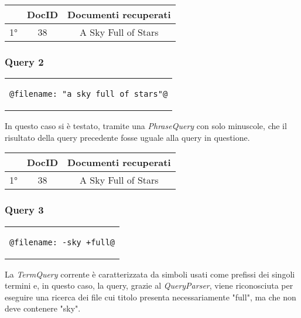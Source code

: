 \documentclass{article}
\begin{document}
\begin{table}[h!]
\centering
    \begin{tabular}{|c|c|c|}
    \hline
    & DocID & Documenti recuperati\\
    \hline
    1° & 38 & A Sky Full of Stars\\
    \hline
\end{tabular}
\end{table}

\subsubsection{Query 2}
\begin{center}
\begin{tabular}{c}
\begin{lstlisting}[style=prompt]
    @filename: "a sky full of stars"@
\end{lstlisting}
\end{tabular}    
\end{center}
In questo caso si è testato, tramite una \textit{PhraseQuery} con solo minuscole, che il risultato della query precedente fosse uguale alla query in questione.

\begin{table}[h!]
\centering
    \begin{tabular}{|c|c|c|}
    \hline
    & DocID & Documenti recuperati\\
    \hline
    1° & 38 & A Sky Full of Stars\\
    \hline
\end{tabular}
\end{table}

\subsubsection{Query 3} \label{filenameSymbolQuery}
\begin{center}
\begin{tabular}{c}
\begin{lstlisting}[style=prompt]
    @filename: -sky +full@
\end{lstlisting}
\end{tabular}    
\end{center}
La \textit{TermQuery} corrente è caratterizzata da simboli usati come prefissi dei singoli termini e, in questo caso, la query, grazie al \textit{QueryParser}, viene riconosciuta per eseguire una ricerca dei file cui titolo presenta necessariamente "full", ma che non deve contenere "sky".
\end{document}
